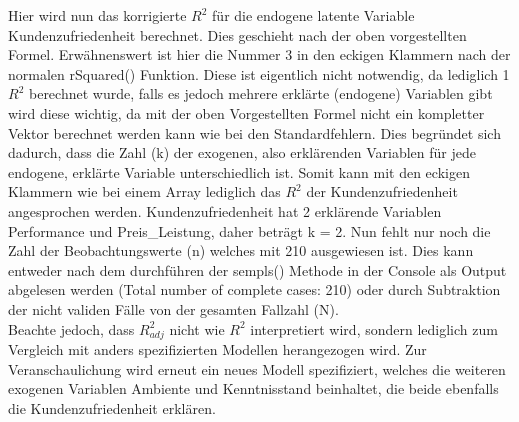 \documentclass{article}\usepackage[]{graphicx}\usepackage[]{color}
\begin{document}
Hier wird nun das korrigierte $R^{2}$ für die endogene latente Variable Kundenzufriedenheit berechnet. Dies geschieht nach der oben vorgestellten Formel. Erwähnenswert ist hier die Nummer 3 in den eckigen Klammern nach der normalen rSquared() Funktion. Diese ist eigentlich nicht notwendig, da lediglich 1 $R^{2}$ berechnet wurde, falls es jedoch mehrere erklärte (endogene) Variablen gibt wird diese wichtig, da mit der oben Vorgestellten Formel nicht ein kompletter Vektor berechnet werden kann wie bei den Standardfehlern. Dies begründet sich dadurch, dass die Zahl (k) der exogenen, also erklärenden Variablen für jede endogene, erklärte Variable unterschiedlich ist. Somit kann mit den eckigen Klammern wie bei einem Array lediglich das $R^{2}$ der Kundenzufriedenheit angesprochen werden. Kundenzufriedenheit hat 2 erklärende Variablen Performance und Preis\_Leistung, daher beträgt k = 2. Nun fehlt nur noch die Zahl der Beobachtungswerte (n) welches mit 210 ausgewiesen ist. Dies kann entweder nach dem durchführen der sempls() Methode in der Console als Output abgelesen werden (Total number of complete cases: 210) oder durch Subtraktion der nicht validen Fälle von der gesamten Fallzahl (N).\\
Beachte jedoch, dass $R^{2}_{adj}$ nicht wie $R^{2}$ interpretiert wird, sondern lediglich zum Vergleich mit anders spezifizierten Modellen herangezogen wird. Zur Veranschaulichung wird erneut ein neues Modell spezifiziert, welches die weiteren exogenen Variablen Ambiente und Kenntnisstand beinhaltet, die beide ebenfalls die Kundenzufriedenheit erklären.
\end{document}
